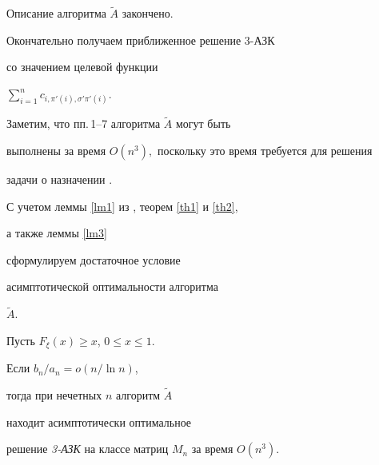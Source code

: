 Описание алгоритма $\widetilde A$ закончено.





Окончательно получаем приближенное решение 3-АЗК 


со значением целевой функции 


$\sum\limits_{i=1}^{n} c_{i,\pi'(i), \sigma' \pi' (i)}$.


Заметим, что пп.\,1--7 алгоритма $\widetilde A$ могут быть 


выполнены за время $O(n^3),$ поскольку это время требуется для решения 


задачи о назначении \cite{DK}. 





С учетом леммы \ref{lm1} из \cite{GGS94}, теорем \ref{th1} и \ref{th2}, 


а также леммы \ref{lm3} 


сформулируем достаточное условие 


асимптотической оптимальности алгоритма 


$\widetilde A$.





\begin{thm}


\label {th3}


Пусть $F_{\xi}(x) \ge x$, $0 \leq x \leq 1$. 


Если $b_n / a_n = o ( n / \ln n )$,


тогда при нечетных $n$ алгоритм $\widetilde A$


находит асимптотически оптимальное


решение {\em 3-АЗК} на классе матриц $M_n$ за время $O(n^3)$.


\end{thm}





